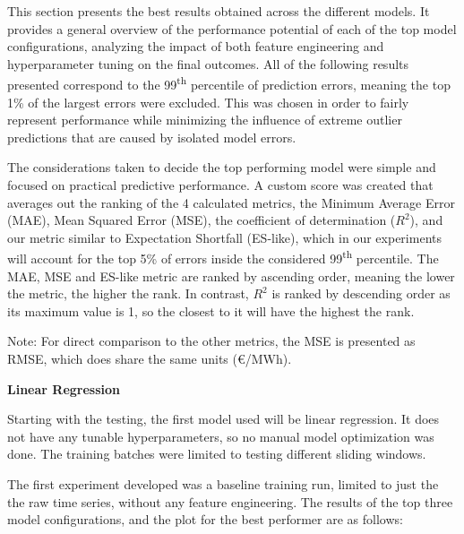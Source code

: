 \documentclass[12pt]{report} %
\begin{document}
This section presents the best results obtained across the different models. It provides a general overview of the performance potential of each of the top model configurations, analyzing the impact of both feature engineering and hyperparameter tuning on the final outcomes. All of the following results presented correspond to the 99\textsuperscript{th} percentile of prediction errors, meaning the top 1\% of the largest errors were excluded. This was chosen in order to fairly represent performance while minimizing the influence of extreme outlier predictions that are caused by isolated model errors.

The considerations taken to decide the top performing model were simple and focused on practical predictive performance. A custom score was created that averages out the ranking of the 4 calculated metrics, the Minimum Average Error (MAE), Mean Squared Error (MSE), the coefficient of determination ($R^2$), and our metric similar to Expectation Shortfall (ES-like), which in our experiments will account for the top 5\% of errors inside the considered 99\textsuperscript{th} percentile. The MAE, MSE and ES-like metric are ranked by ascending order, meaning the lower the metric, the higher the rank. In contrast, $R^2$ is ranked by descending order as its maximum value is 1, so the closest to it will have the highest the rank.

Note: For direct comparison to the other metrics, the MSE is presented as RMSE, which does share the same units (€/MWh).


\noindent \textbf{Linear Regression}

Starting with the testing, the first model used will be linear regression. It does not have any tunable hyperparameters, so no manual model optimization was done. The training batches were limited to testing different sliding windows.

The first experiment developed was a baseline training run, limited to just the the raw time series, without any feature engineering. The results of the top three model configurations, and the plot for the best performer are as follows:
\end{document}

